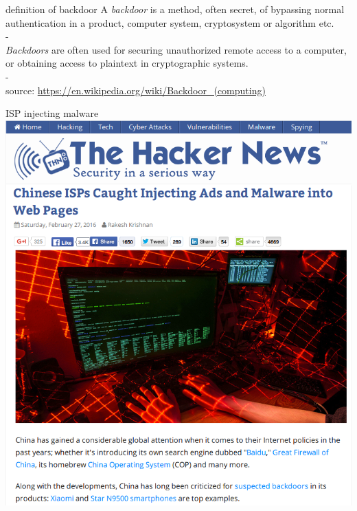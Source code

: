 \documentclass[11pt]{beamer}
\begin{document}
\begin{frame}{definition of backdoor}
A \emph{backdoor} is a method, often secret, of bypassing normal authentication in a product, computer system, cryptosystem or algorithm etc.\\
-\\
\emph{Backdoors} are often used for securing unauthorized remote access to a computer, or obtaining access to plaintext in cryptographic systems.\\
-\\
source: \href{https://en.wikipedia.org/wiki/Backdoor\textunderscore(computing)}{https://en.wikipedia.org/wiki/Backdoor\_(computing)}
\end{frame}

\begin{frame}{ISP injecting malware}
\includegraphics[scale=0.28]{isp_malware.png}
\end{frame}
\end{document}
